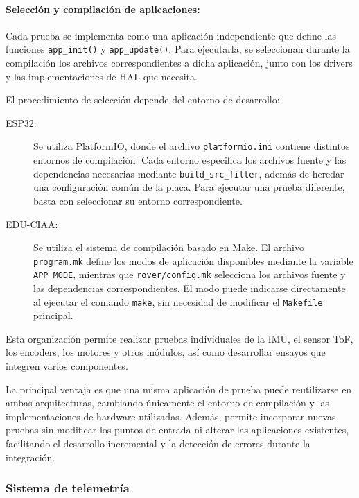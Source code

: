 \paragraph{Selección y compilación de aplicaciones:}

Cada prueba se implementa como una aplicación independiente que define las funciones \texttt{app\_init()} y \texttt{app\_update()}. Para ejecutarla, se seleccionan durante la compilación los archivos correspondientes a dicha aplicación, junto con los drivers y las implementaciones de HAL que necesita.

El procedimiento de selección depende del entorno de desarrollo:

\begin{description}
	\item[ESP32:] Se utiliza PlatformIO, donde el archivo \texttt{platformio.ini} contiene distintos entornos de compilación. Cada entorno especifica los archivos fuente y las dependencias necesarias mediante \texttt{build\_src\_filter}, además de heredar una configuración común de la placa. Para ejecutar una prueba diferente, basta con seleccionar su entorno correspondiente.
	
	\item[EDU-CIAA:] Se utiliza el sistema de compilación basado en Make. El archivo \texttt{program.mk} define los modos de aplicación disponibles mediante la variable \texttt{APP\_MODE}, mientras que \texttt{rover/config.mk} selecciona los archivos fuente y las dependencias correspondientes. El modo puede indicarse directamente al ejecutar el comando \texttt{make}, sin necesidad de modificar el \texttt{Makefile} principal.
\end{description}

Esta organización permite realizar pruebas individuales de la IMU, el sensor ToF, los encoders, los motores y otros módulos, así como desarrollar ensayos que integren varios componentes.

La principal ventaja es que una misma aplicación de prueba puede reutilizarse en ambas arquitecturas, cambiando únicamente el entorno de compilación y las implementaciones de hardware utilizadas. Además, permite incorporar nuevas pruebas sin modificar los puntos de entrada ni alterar las aplicaciones existentes, facilitando el desarrollo incremental y la detección de errores durante la integración.

\subsubsection{Sistema de telemetría}

